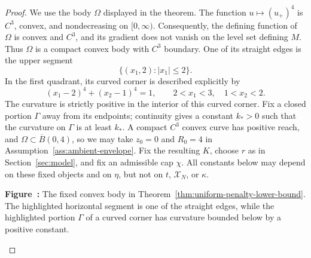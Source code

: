 \documentclass{article}
\numberwithin{equation}{section}
\begin{document}
\begin{proof}
We use the body $\Omega$ displayed in the theorem. The function
$u\mapsto(u_+)^4$ is $C^3$, convex, and nondecreasing on $[0,\infty)$.
Consequently, the defining function of $\Omega$ is convex and $C^3$, and
its gradient does not vanish on the level set defining $M$. Thus $\Omega$
is a compact convex body with $C^3$ boundary. One of its straight edges is
the upper segment
\[
 \{(x_1,2):|x_1|\le2\}.
\]
In the first quadrant, its curved corner is described explicitly by
\[
 (x_1-2)^4+(x_2-1)^4=1,
 \qquad 2<x_1<3,\quad 1<x_2<2.
\]
The curvature is strictly positive in the interior of this curved corner.
Fix a closed portion $\Gamma$ away from its endpoints; continuity gives a constant
$k_*>0$ such that the curvature on $\Gamma$ is at least $k_*$. A compact
$C^3$ convex curve has positive reach, and
$\Omega\subset\overline B(0,4)$, so we may take $z_0=0$ and $R_0=4$ in
Assumption~\ref{ass:ambient-envelope}. Fix the resulting $K$, choose $r$ as
in Section~\ref{sec:model}, and fix an admissible cap $\chi$. All constants
below may depend on these fixed objects and on $\eta$, but not on $t$,
$\mathcal X_N$, or $\kappa$.

\begingroup
\renewcommand{\theHfigure}{lowerbound.\arabic{figure}}
\label{fig:lower-bound-body}
\begin{center}
\par\smallskip
\begin{minipage}{0.9\linewidth}
\small
\textbf{Figure~\thefigure:}
The fixed convex body in
Theorem~\ref{thm:uniform-penalty-lower-bound}. The highlighted horizontal
segment is one of the straight edges, while the highlighted portion
$\Gamma$ of a curved corner has curvature bounded below by a positive
constant.
\end{minipage}
\end{center}
\endgroup


\end{proof}
\end{document}
